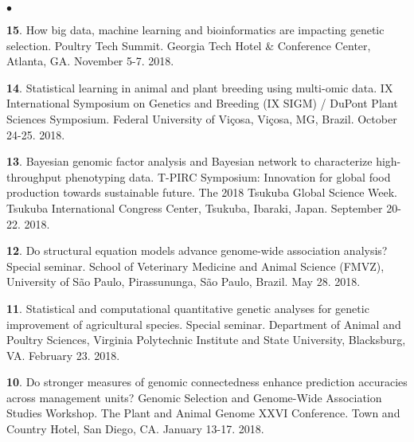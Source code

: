 \documentclass[margin,line,10pt]{res}
\newenvironment{list2}{
  \begin{list}{$\bullet$}{%
      \setlength{\itemsep}{0in}
      \setlength{\parsep}{0in} \setlength{\parskip}{0in}
      \setlength{\topsep}{0in} \setlength{\partopsep}{0in} 
      \setlength{\leftmargin}{0.2in}}}{\end{list}}
\begin{document}
\begin{resume}
\begin{list2}
     \vspace{0.5cm}
     
    \item [{\bf 15}.] How big data, machine learning and bioinformatics are impacting genetic selection. Poultry Tech Summit. Georgia Tech Hotel \& Conference Center, Atlanta, GA. November 5-7. 2018. 

      \vspace{0.5cm}
      
  \item [{\bf 14}.] Statistical learning in animal and plant breeding using multi-omic data. IX International Symposium on Genetics and Breeding (IX SIGM) / DuPont Plant Sciences Symposium.  Federal University of Vi\c cosa, Vi\c cosa, MG, Brazil. October 24-25. 2018.
  
  
  \vspace{0.5cm}
  
\item [{\bf 13}.] Bayesian genomic factor analysis and Bayesian network to characterize high-throughput phenotyping data. T-PIRC Symposium: Innovation for global food production towards sustainable future. The 2018 Tsukuba Global Science Week. Tsukuba International Congress Center, Tsukuba, Ibaraki, Japan. September 20-22. 2018.
  

  \vspace{0.5cm}
  
  
\item [{\bf 12}.] Do structural equation models advance genome-wide association analysis? Special seminar. School of Veterinary Medicine and Animal Science (FMVZ), University of S\~{a}o Paulo, Pirassununga, S\~{a}o Paulo, Brazil.  May 28. 2018.

    \vspace{0.5cm}
    
\item [{\bf 11}.]  Statistical and computational quantitative genetic analyses for genetic improvement of agricultural species. Special seminar.  Department of Animal and Poultry Sciences, Virginia Polytechnic Institute and State University, Blacksburg, VA. February 23. 2018.

  \vspace{0.5cm}
  
\item [{\bf 10}.] Do stronger measures of genomic connectedness enhance prediction accuracies across management units?  Genomic Selection and Genome-Wide Association Studies Workshop. The Plant and Animal Genome XXVI Conference. Town and Country Hotel, San Diego, CA. January 13-17. 2018. 
  

\end{list2}
\end{resume}
\end{document}
